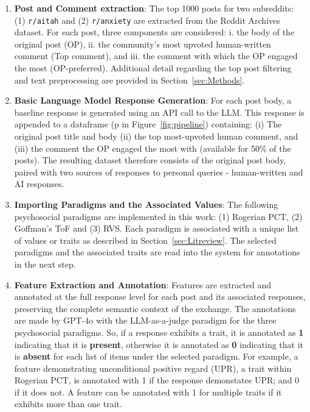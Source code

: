 \begin{enumerate}\label{pipeline_steps}
    \item \textbf{Post and Comment extraction}: The top 1000 posts for two subreddits: (1) \texttt{r/aitah} and (2) \texttt{r/anxiety} are extracted from the Reddit Archives dataset. For each post, three components are considered: i. the body of the original post (OP), ii. the community's most upvoted human-written comment (Top comment), and iii. the comment with which the OP engaged the most (OP-preferred). Additional detail regarding the top post filtering and text preprocessing are provided in Section~\ref{sec:Methods}.
    \item \textbf{Basic Language Model Response Generation}: For each post body, a baseline response is generated using an API call to the LLM. This response is appended to a dataframe (p in Figure~\ref{fig:pipeline}) containing: (i) The original post title and body (ii) the top most-upvoted human comment, and (iii) the comment the OP engaged the most with (available for 50\% of the posts). The resulting dataset therefore consists of the original post body, paired with two sources of responses to personal queries - human-written and AI responses.
    \item \textbf{Importing Paradigms and the Associated Values}: The following psychosocial paradigms are implemented in this work: (1) Rogerian PCT, (2) Goffman’s ToF and (3) RVS. 
    Each paradigm is associated with a unique list of values or traits as described in Section~\ref{sec:Litreview}. The selected paradigms and the associated traits are read into the system for annotations in the next step.
    \item \textbf{Feature Extraction and Annotation}: 
    Features are extracted and annotated at the full response level for each post and its associated responses, preserving the complete semantic context of the exchange.
    The annotations are made by GPT-4o with the LLM-as-a-judge \cite{zheng-et-al} paradigm for the three psychosocial paradigms. So, if a response exhibits a trait, it is annotated as \textbf{1} indicating that it is \textbf{present}, otherwise it is annotated as \textbf{0} indicating that it is \textbf{absent} for each list of items under the selected paradigm. For example, a feature demonstrating unconditional positive regard (UPR), a trait within Rogerian PCT, is annotated with 1 if the response demonstates UPR; and 0 if it does not. A feature can be annotated with 1 for multiple traits if it exhibits more than one trait.


\end{enumerate}

